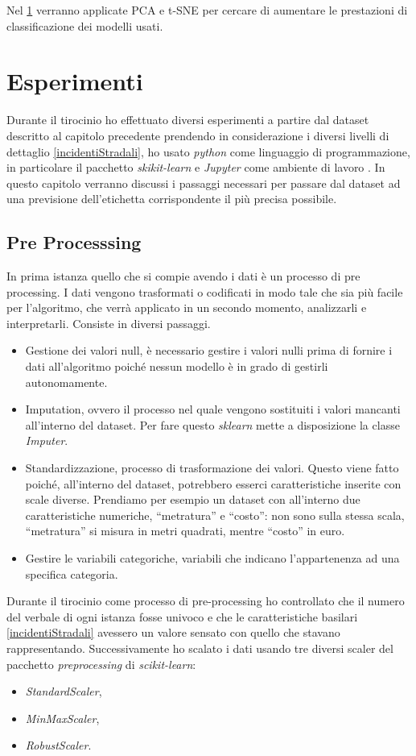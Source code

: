 \documentclass[12pt,italian]{report}
\begin{document}
Nel \ref{cap3} verranno applicate PCA e t-SNE per cercare di aumentare le prestazioni di classificazione dei modelli usati.



% 
% 

\chapter{Esperimenti}
\label{cap3}
Durante il tirocinio ho effettuato diversi esperimenti a partire dal dataset descritto al capitolo precedente prendendo in considerazione i diversi livelli di dettaglio \ref{incidentiStradali}, ho usato \emph{python} come linguaggio di programmazione, in particolare il pacchetto \emph{skikit-learn} \cite{scikit-learn} e \emph{Jupyter} come ambiente di lavoro \cite{jupyter}.
In questo capitolo verranno discussi i passaggi necessari per passare dal dataset ad una previsione dell'etichetta corrispondente il più precisa possibile.
\section{Pre Processsing}
\label{preprocessing}
In prima istanza quello che si compie avendo i dati è un processo di pre processing. I dati vengono trasformati o codificati in modo tale che sia più facile per l'algoritmo, che verrà applicato in un secondo momento,  analizzarli e interpretarli.
Consiste in diversi passaggi.
\begin{itemize}
	\item Gestione dei valori null, è necessario gestire i valori nulli prima di fornire i dati all'algoritmo poiché nessun modello è in grado di gestirli autonomamente.
	\item Imputation, ovvero il processo nel quale vengono sostituiti i valori mancanti all'interno del dataset. Per fare questo \emph{sklearn} mette a disposizione la classe \emph{Imputer}.
	\item Standardizzazione, processo di trasformazione dei valori. Questo viene fatto poiché, all'interno del dataset, potrebbero esserci caratteristiche inserite con scale diverse. Prendiamo per esempio un dataset con all'interno due caratteristiche numeriche, ``metratura'' e ``costo'': non sono sulla stessa scala, ``metratura'' si misura in metri quadrati, mentre ``costo'' in euro. 
	\item Gestire le variabili categoriche, variabili che indicano l'appartenenza ad una specifica categoria.
\end{itemize}
Durante il tirocinio come processo di pre-processing ho controllato che il numero del verbale di ogni istanza fosse univoco e che le caratteristiche basilari \ref{incidentiStradali} avessero un valore sensato con quello che stavano rappresentando. Successivamente ho scalato i dati usando tre diversi scaler del pacchetto \emph{preprocessing} di \emph{scikit-learn}:
\begin{itemize}
	\item \emph{StandardScaler},
	\item \emph{MinMaxScaler},
	\item \emph{RobustScaler}.
\end{itemize} 
\end{document}
